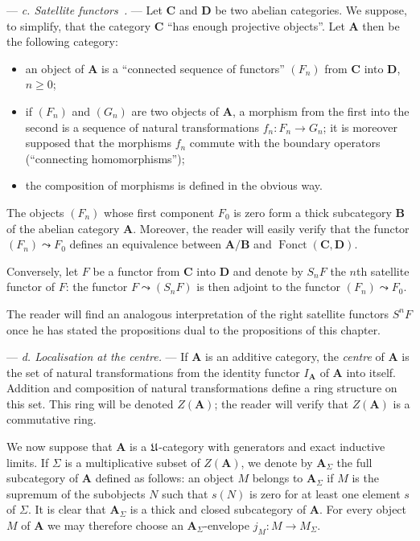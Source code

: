 --- \emph{c. Satellite functors~\cite{cartan-eilenberg}.} --- Let $\mathbf{C}$ and
$\mathbf{D}$ be two abelian categories. We suppose, to simplify, that the
category $\mathbf{C}$ ``has enough projective objects''. Let $\mathbf{A}$
then be the following category:
\begin{itemize}
\item an object of $\mathbf{A}$ is a ``connected sequence of functors''
$(F_n)$ from $\mathbf{C}$ into $\mathbf{D}$, $n\geq 0$;
\item if $(F_n)$ and $(G_n)$ are two objects of $\mathbf{A}$, a morphism
from the first into the second is a sequence of natural transformations
$f_n\colon F_n\to G_n$; it is moreover supposed that the morphisms $f_n$
commute with the boundary operators (``connecting homomorphisms'');
\item the composition of morphisms is defined in the obvious way.
\end{itemize}

The objects $(F_n)$ whose first component $F_0$ is zero form a thick
subcategory $\mathbf{B}$ of the abelian category $\mathbf{A}$. Moreover,
the reader will easily verify that the functor
$(F_n)\leadsto F_0$ defines an equivalence between $\mathbf{A}/\mathbf{B}$
and $\operatorname{Fonct}(\mathbf{C},\mathbf{D})$.

Conversely, let $F$ be a functor from $\mathbf{C}$ into $\mathbf{D}$ and
denote by $S_nF$ the $n$th satellite functor of $F$: the functor
$F\leadsto (S_nF)$ is then adjoint to the functor $(F_n)\leadsto F_0$.

The reader will find an analogous interpretation of the right satellite
functors $S^nF$ once he has stated the propositions dual to the
propositions of this chapter.

--- \emph{d. Localisation at the centre.} --- If $\mathbf{A}$ is an
additive category, the \emph{centre} of $\mathbf{A}$ is the set of natural
transformations from the identity functor $I_{\mathbf{A}}$ of
$\mathbf{A}$ into itself. Addition and composition of natural
transformations define a ring structure on this set. This ring will be
denoted $Z(\mathbf{A})$; the reader will verify that $Z(\mathbf{A})$ is a
commutative ring.

We now suppose that $\mathbf{A}$ is a $\mathfrak{U}$-category with generators and
exact inductive limits. If $\Sigma$ is a multiplicative subset of
$Z(\mathbf{A})$, we denote by $\mathbf{A}_{\Sigma}$ the full subcategory
of $\mathbf{A}$ defined as follows: an object $M$ belongs to
$\mathbf{A}_{\Sigma}$ if $M$ is the supremum of the subobjects $N$ such
that $s(N)$ is zero for at least one element $s$ of $\Sigma$. It is clear
that $\mathbf{A}_{\Sigma}$ is a thick and closed subcategory of
$\mathbf{A}$. For every object $M$ of $\mathbf{A}$ we may therefore choose
an $\mathbf{A}_{\Sigma}$-envelope $j_M\colon M\to M_{\Sigma}$.

